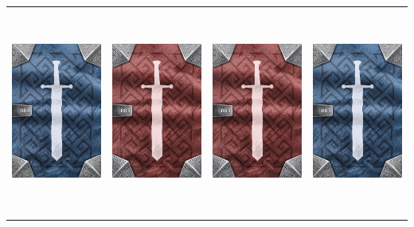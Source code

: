\documentclass{minimal}
\begin{document}
{\begin{longtable}{llll}
\includegraphics[width=44mm,height=68mm]{./64-151/gh-084a-wand-of-storms-back.png} &
\includegraphics[width=44mm,height=68mm]{./64-151/gh-083b-wand-of-frost-back.png} &
\includegraphics[width=44mm,height=68mm]{./64-151/gh-083b-wand-of-frost-back.png} &
\includegraphics[width=44mm,height=68mm]{./64-151/gh-083a-wand-of-frost-back.png}\\ 

\end{longtable}}
\end{document}
